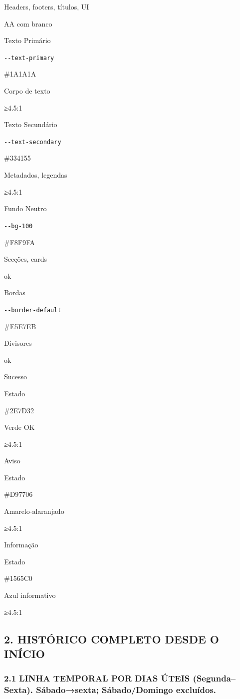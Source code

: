 Headers, footers, títulos, UI

AA com branco

Texto Primário

\texttt{-\/-text-primary}

\#1A1A1A

Corpo de texto

≥4.5:1

Texto Secundário

\texttt{-\/-text-secondary}

\#334155

Metadados, legendas

≥4.5:1

Fundo Neutro

\texttt{-\/-bg-100}

\#F8F9FA

Secções, cards

ok

Bordas

\texttt{-\/-border-default}

\#E5E7EB

Divisores

ok

Sucesso

Estado

\#2E7D32

Verde OK

≥4.5:1

Aviso

Estado

\#D97706

Amarelo-alaranjado

≥4.5:1

Informação

Estado

\#1565C0

Azul informativo

≥4.5:1

\subsection{2. HISTÓRICO COMPLETO DESDE O
INÍCIO}\label{histuxf3rico-completo-desde-o-inuxedcio}

\subsubsection{2.1 LINHA TEMPORAL POR DIAS ÚTEIS (Segunda--Sexta).
Sábado→sexta; Sábado/Domingo
excluídos.}\label{linha-temporal-por-dias-uxfateis-segundasexta.-suxe1badosexta-suxe1badodomingo-excluuxeddos.}

